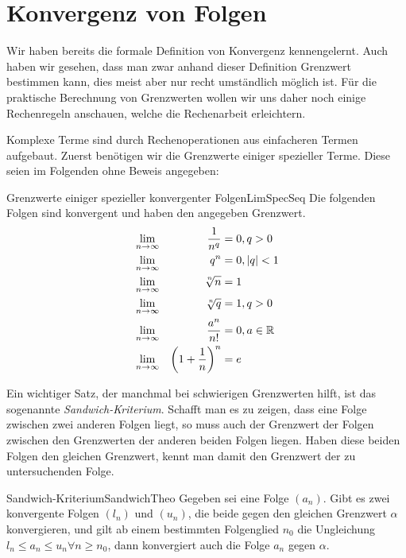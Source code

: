 \section{Konvergenz von Folgen}

Wir haben bereits die formale Definition von Konvergenz kennengelernt. Auch haben wir gesehen, dass man zwar anhand dieser Definition Grenzwert bestimmen kann, dies meist aber nur recht umständlich möglich ist. Für die praktische Berechnung von Grenzwerten wollen wir uns daher noch einige Rechenregeln anschauen, welche die Rechenarbeit erleichtern.

Komplexe Terme sind durch Rechenoperationen aus einfacheren Termen aufgebaut. Zuerst benötigen wir die Grenzwerte einiger spezieller Terme. Diese seien im Folgenden ohne Beweis angegeben:

\begin{statement}{Grenzwerte einiger spezieller konvergenter Folgen}{LimSpecSeq}
	Die folgenden Folgen sind konvergent und haben den angegeben Grenzwert.
	\begin{alignat}{3}
		& \lim\limits_{n\to\infty} & \frac{1}{n^q}  & = 0, q > 0 \label{eq:LimitInv1nq} \\
		& \lim\limits_{n\to\infty} & q^n & = 0, |q| < 1 \\
		& \lim\limits_{n\to\infty} & \nroot{n}{n} & = 1 \\
		& \lim\limits_{n\to\infty} & \nroot{n}{q} & = 1, q > 0 \\
		& \lim\limits_{n\to\infty} & \frac{a^n}{n!} & = 0, a \in \R \label{eq:LimitPowerFactorial} \\
		& \lim\limits_{n\to\infty} & \left(1+\frac{1}{n}\right)^n & = e \label{eq:LimitExp}
	\end{alignat}
\end{statement}

Ein wichtiger Satz, der manchmal bei schwierigen Grenzwerten hilft, ist das sogenannte \emph{Sandwich-Kriterium}. Schafft man es zu zeigen, dass eine Folge zwischen zwei anderen Folgen liegt, so muss auch der Grenzwert der Folgen zwischen den Grenzwerten der anderen beiden Folgen liegen. Haben diese beiden Folgen den gleichen Grenzwert, kennt man damit den Grenzwert der zu untersuchenden Folge.

\begin{statement}{Sandwich-Kriterium}{SandwichTheo}
	Gegeben sei eine Folge $(a_n)$. Gibt es zwei konvergente Folgen $(l_n)$ und $(u_n)$, die beide gegen den gleichen Grenzwert $\alpha$ konvergieren, und gilt ab einem bestimmten Folgenglied $n_0$ die Ungleichung $l_n \le a_n \le u_n \forall n \ge n_0$, dann konvergiert auch die Folge $a_n$ gegen $\alpha$.
\end{statement}

